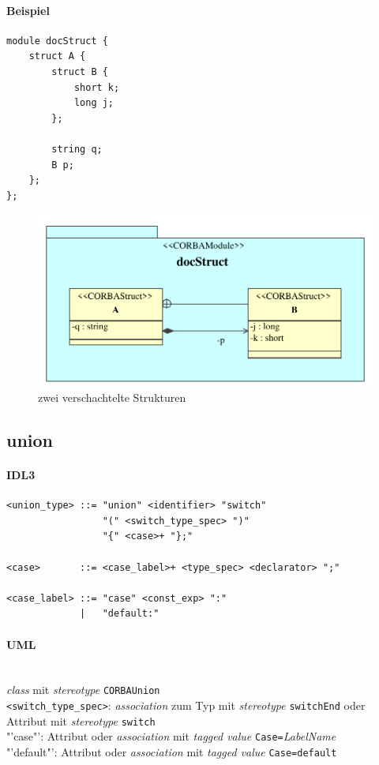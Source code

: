 \documentclass [a4paper,10pt] {scrartcl}
\begin{document}
\paragraph{Beispiel}
\begin{verbatim}
module docStruct {
    struct A {
        struct B {
            short k;
            long j;
        };

        string q;
        B p;
    };
};
\end{verbatim}
\begin{figure}[!h]
\centerline{\includegraphics[width=\linewidth]{docStruct}}
\caption{zwei verschachtelte Strukturen}
\label{fig:struct}
\end{figure}

\cleardoublepage
\subsection{union}
\paragraph{IDL3}
\begin{verbatim}
<union_type> ::= "union" <identifier> "switch"
                 "(" <switch_type_spec> ")"
                 "{" <case>+ "};"

<case>       ::= <case_label>+ <type_spec> <declarator> ";"

<case_label> ::= "case" <const_exp> ":"
             |   "default:"
\end{verbatim}
\paragraph{UML}~\\
\emph{class} mit \emph{stereotype} \texttt{CORBAUnion}\\
\verb"<switch_type_spec>": \emph{association} zum Typ mit \emph{stereotype} \texttt{switchEnd}
oder Attribut mit \emph{stereotype} \texttt{switch}\\
"'case"': Attribut oder \emph{association} mit \emph{tagged value} \texttt{Case=}\emph{LabelName}\\
"'default"': Attribut oder \emph{association} mit \emph{tagged value} \texttt{Case=default}\\
\end{document}

